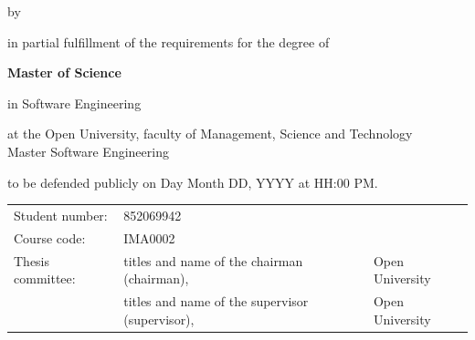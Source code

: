 \begin{titlepage}

\begin{center}


\vspace*{2\bigskipamount}

{\makeatletter
\titlestyle\color{red}\Huge\@title\par
\makeatother}

{\makeatletter
\ifx\@subtitle\undefined\else
    \bigskip
    \titlefont\titleshape\LARGE\@subtitle
\fi
\makeatother}

\bigskip
\bigskip

by

\bigskip
\bigskip

{\makeatletter
\titlefont\Large\bfseries\@author
\makeatother}

\vfill

in partial fulfillment of the requirements for the degree of

\bigskip
\bigskip

{\bfseries Master of Science}

in Software Engineering

\bigskip
\bigskip

at the Open University, faculty of Management, Science and Technology \\
Master Software Engineering

to be defended publicly on Day Month DD, YYYY at HH:00 PM.

\vfill

\begin{tabular}{lll}
    Student number: & 852069942 \\
    Course code: & IMA0002\\
    Thesis committee:
        & titles and name of the chairman (chairman), & Open University \\
        & titles and name of the supervisor (supervisor), & Open University
\end{tabular}


\end{center}
\end{titlepage}
